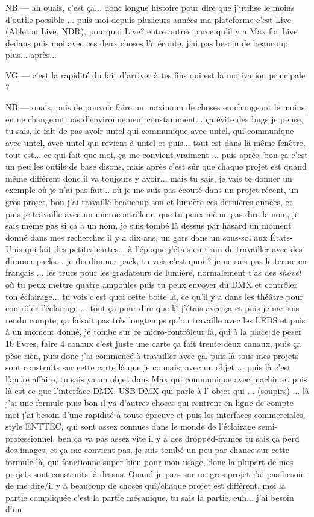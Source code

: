 NB — ah ouais, c'est ça...  donc longue histoire pour dire que j'utilise le moins d'outils possible ... puis moi depuis plusieurs années ma plateforme c'est Live (Ableton Live, NDR), pourquoi Live? entre autres parce qu'il y a Max for Live dedans puis moi avec ces deux choses là, écoute, j'ai pas besoin de beaucoup plus... après... 

VG — c'est la rapidité du fait d'arriver à tes fins qui est la motivation principale ?

NB — ouais, puis de pouvoir faire un maximum de choses en changeant le moins, en ne changeant pas d'environnement constamment... ça évite des bugs je pense, tu sais, le fait de pas avoir untel qui communique avec untel, qui communique avec untel, avec untel qui revient à untel et puis... tout est dans la même fenêtre, tout est... ce qui fait que moi, ça me convient vraiment ... puis après, bon ça c'est un peu  les outils de base disons, mais après c'est sûr que chaque projet est quand même différent donc il va toujours y avoir... mais tu sais, je vais te donner un exemple où je n'ai pas fait... où je me suis pas écouté dans un projet récent, un gros projet, bon j'ai travaillé beaucoup son et lumière ces dernières années, et puis je travaille avec un microcontrôleur, que tu peux même pas dire le nom, je sais même pas si ça a un nom,  je suis tombé là dessus par hasard un moment donné dans mes recherches il y a dix ans, un gars dans un sous-sol aux États-Unis qui fait des petites cartes... à l'époque j'étais en train de travailler avec des dimmer-packs... je dis dimmer-pack, tu vois c'est quoi ? je ne sais pas le terme en français ...  les trucs pour les gradateurs de lumière, normalement t'as des \textit{shovel} où tu peux mettre quatre ampoules puis tu peux envoyer du DMX et contrôler ton éclairage... tu vois c'est quoi cette boite là, ce qu'il y a dans les théâtre pour contrôler l'éclairage ... tout ça pour dire que là j'étais avec ça et puis je me suis rendu compte, ça faisait pas très longtemps qu'on travaille avec les LEDS et puis à un moment donné, je tombe sur ce micro-contrôleur là, qui à la place de peser 10 livres, faire 4 canaux c'est juste une carte ça fait trente deux canaux, puis ça pèse rien, puis donc j'ai commencé à travailler avec ça, puis là tous mes projets sont construits sur cette carte là que je connais, avec un objet ... puis là c'est l'autre affaire, tu sais ya un objet dans Max qui communique avec machin et puis là est-ce que l'interface DMX, USB-DMX qui parle à l' objet qui ... (soupirs) ... là j'ai une formule puis bon il ya d'autres choses qui rentrent en ligne de compte moi j'ai besoin d'une rapidité à toute épreuve et puis les interfaces commerciales, style ENTTEC, qui sont assez connues dans le monde de l'éclairage semi-professionnel, ben ça va pas assez vite il y a des dropped-frames tu sais ça perd des images, et ça me convient pas, je suis tombé un peu par chance sur cette formule là, qui fonctionne super bien pour mon usage, donc la plupart de mes projets sont construits là dessus. Quand je pars sur un gros projet j'ai pas besoin de me dire/il y a beaucoup de choses qui/chaque projet est différent, moi la partie compliquée c'est la partie mécanique, tu sais la partie, euh...  j'ai besoin d'un 